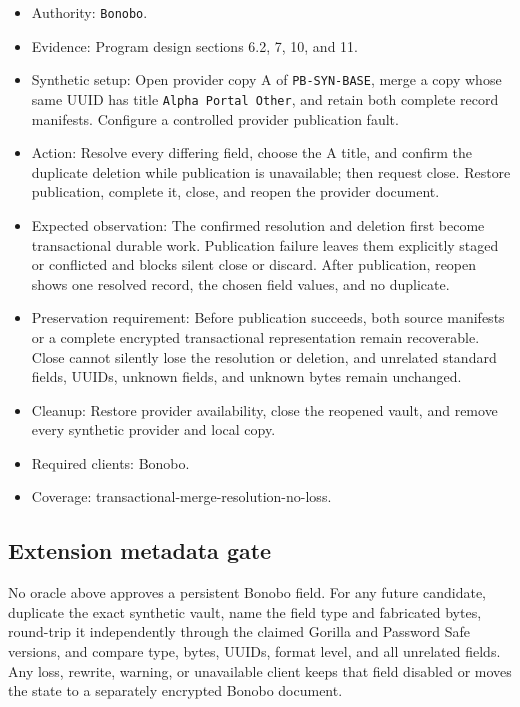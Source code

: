 \documentclass[
  letterpaper,
]{article}
\newcommand{\passthrough}[1]{#1}
\providecommand{\tightlist}{%
  \setlength{\itemsep}{0pt}\setlength{\parskip}{0pt}}
\begin{document}
\begin{itemize}
\tightlist
\item
  Authority: \passthrough{\lstinline!Bonobo!}.
\item
  Evidence: Program design sections 6.2, 7, 10, and 11.
\item
  Synthetic setup: Open provider copy A of \nolinkurl{PB-SYN-BASE}, merge a copy whose same UUID has title
  \passthrough{\lstinline!Alpha Portal Other!}, and retain both complete record manifests. Configure a controlled
  provider publication fault.
\item
  Action: Resolve every differing field, choose the A title, and confirm the duplicate deletion while publication is
  unavailable; then request close. Restore publication, complete it, close, and reopen the provider document.
\item
  Expected observation: The confirmed resolution and deletion first become transactional durable work. Publication
  failure leaves them explicitly staged or conflicted and blocks silent close or discard. After publication, reopen
  shows one resolved record, the chosen field values, and no duplicate.
\item
  Preservation requirement: Before publication succeeds, both source manifests or a complete encrypted transactional
  representation remain recoverable. Close cannot silently lose the resolution or deletion, and unrelated standard
  fields, UUIDs, unknown fields, and unknown bytes remain unchanged.
\item
  Cleanup: Restore provider availability, close the reopened vault, and remove every synthetic provider and local copy.
\item
  Required clients: Bonobo.
\item
  Coverage: transactional-merge-resolution-no-loss.
\end{itemize}

\subsection{Extension metadata gate}\label{extension-metadata-gate}

No oracle above approves a persistent Bonobo field. For any future candidate, duplicate the exact synthetic vault, name
the field type and fabricated bytes, round-trip it independently through the claimed Gorilla and Password Safe versions,
and compare type, bytes, UUIDs, format level, and all unrelated fields. Any loss, rewrite, warning, or unavailable
client keeps that field disabled or moves the state to a separately encrypted Bonobo document.
\end{document}
